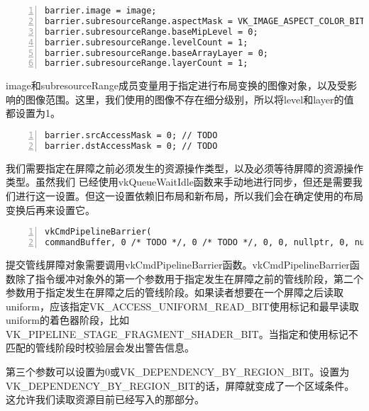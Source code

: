 \documentclass{ctexart}
\begin{document}
\begin{lstlisting}[language={[ANSI]C},keywordstyle=\color{blue!70},commentstyle=\color{red!50!green!50!blue!50},frame=shadowbox, rulesepcolor=\color{red!20!green!20!blue!20},basicstyle=\small,numbers=left, numberstyle=\tiny,breaklines=true]
barrier.image = image;
barrier.subresourceRange.aspectMask = VK_IMAGE_ASPECT_COLOR_BIT;
barrier.subresourceRange.baseMipLevel = 0;
barrier.subresourceRange.levelCount = 1;
barrier.subresourceRange.baseArrayLayer = 0;
barrier.subresourceRange.layerCount = 1;
\end{lstlisting}

image和subresourceRange成员变量用于指定进行布局变换的图像对象，以及受影响的图像范围。这里，我们使用的图像不存在细分级别，所以将level和layer的值都设置为1。

\begin{lstlisting}[language={[ANSI]C},keywordstyle=\color{blue!70},commentstyle=\color{red!50!green!50!blue!50},frame=shadowbox, rulesepcolor=\color{red!20!green!20!blue!20},basicstyle=\small,numbers=left, numberstyle=\tiny,breaklines=true]
barrier.srcAccessMask = 0; // TODO
barrier.dstAccessMask = 0; // TODO
\end{lstlisting}

我们需要指定在屏障之前必须发生的资源操作类型，以及必须等待屏障的资源操作类型。虽然我们 已经使用vkQueueWaitIdle函数来手动地进行同步，但还是需要我们进行这一设置。但这一设置依赖旧布局和新布局，所以我们会在确定使用的布局变换后再来设置它。

\begin{lstlisting}[language={[ANSI]C},keywordstyle=\color{blue!70},commentstyle=\color{red!50!green!50!blue!50},frame=shadowbox, rulesepcolor=\color{red!20!green!20!blue!20},basicstyle=\small,numbers=left, numberstyle=\tiny,breaklines=true]
vkCmdPipelineBarrier(
commandBuffer, 0 /* TODO */, 0 /* TODO */, 0, 0, nullptr, 0, nullptr, 1, &barrier);
\end{lstlisting}

提交管线屏障对象需要调用vkCmdPipelineBarrier函数。vkCmdPipelineBarrier函数除了指令缓冲对象外的第一个参数用于指定发生在屏障之前的管线阶段，第二个参数用于指定发生在屏障之后的管线阶段。如果读者想要在一个屏障之后读取uniform，应该指定VK\_ACCESS\_UNIFORM\_READ\_BIT使用标记和最早读取uniform的着色器阶段，比如VK\_PIPELINE\_STAGE\_FRAGMENT\_SHADER\_BIT。当指定和使用标记不匹配的管线阶段时校验层会发出警告信息。

第三个参数可以设置为0或VK\_DEPENDENCY\_BY\_REGION\_BIT。设置为VK\_DEPENDENCY\_BY\_REGION\_BIT的话，屏障就变成了一个区域条件。这允许我们读取资源目前已经写入的那部分。
\end{document}

